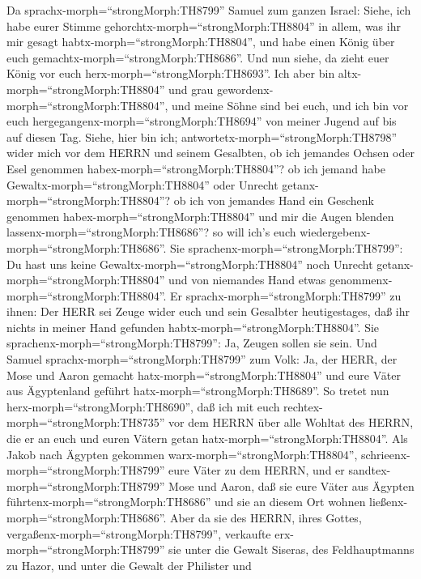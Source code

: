  Da sprachx-morph=``strongMorph:TH8799'' Samuel zum ganzen
Israel: Siehe, ich habe eurer Stimme
gehorchtx-morph=``strongMorph:TH8804'' in allem, was ihr mir gesagt
habtx-morph=``strongMorph:TH8804'', und habe einen König über euch
gemachtx-morph=``strongMorph:TH8686''.  Und nun siehe, da
zieht euer König vor euch herx-morph=``strongMorph:TH8693''. Ich aber
bin altx-morph=``strongMorph:TH8804'' und grau
gewordenx-morph=``strongMorph:TH8804'', und meine Söhne sind bei euch,
und ich bin vor euch hergegangenx-morph=``strongMorph:TH8694'' von
meiner Jugend auf bis auf diesen Tag.  Siehe, hier bin ich;
antwortetx-morph=``strongMorph:TH8798'' wider mich vor dem HERRN und
seinem Gesalbten, ob ich jemandes Ochsen oder Esel genommen
habex-morph=``strongMorph:TH8804''? ob ich jemand habe
Gewaltx-morph=``strongMorph:TH8804'' oder Unrecht
getanx-morph=``strongMorph:TH8804''? ob ich von jemandes Hand ein
Geschenk genommen habex-morph=``strongMorph:TH8804'' und mir die Augen
blenden lassenx-morph=``strongMorph:TH8686''? so will ich's euch
wiedergebenx-morph=``strongMorph:TH8686''.  Sie
sprachenx-morph=``strongMorph:TH8799'': Du hast uns keine
Gewaltx-morph=``strongMorph:TH8804'' noch Unrecht
getanx-morph=``strongMorph:TH8804'' und von niemandes Hand etwas
genommenx-morph=``strongMorph:TH8804''.  Er
sprachx-morph=``strongMorph:TH8799'' zu ihnen: Der HERR sei Zeuge wider
euch und sein Gesalbter heutigestages, daß ihr nichts in meiner Hand
gefunden habtx-morph=``strongMorph:TH8804''. Sie
sprachenx-morph=``strongMorph:TH8799'': Ja, Zeugen sollen sie sein.
 Und Samuel sprachx-morph=``strongMorph:TH8799'' zum Volk:
Ja, der HERR, der Mose und Aaron gemacht
hatx-morph=``strongMorph:TH8804'' und eure Väter aus Ägyptenland geführt
hatx-morph=``strongMorph:TH8689''.  So tretet nun
herx-morph=``strongMorph:TH8690'', daß ich mit euch
rechtex-morph=``strongMorph:TH8735'' vor dem HERRN über alle Wohltat des
HERRN, die er an euch und euren Vätern getan
hatx-morph=``strongMorph:TH8804''.  Als Jakob nach Ägypten
gekommen warx-morph=``strongMorph:TH8804'',
schrieenx-morph=``strongMorph:TH8799'' eure Väter zu dem HERRN, und er
sandtex-morph=``strongMorph:TH8799'' Mose und Aaron, daß sie eure Väter
aus Ägypten führtenx-morph=``strongMorph:TH8686'' und sie an diesem Ort
wohnen ließenx-morph=``strongMorph:TH8686''.  Aber da sie
des HERRN, ihres Gottes, vergaßenx-morph=``strongMorph:TH8799'',
verkaufte erx-morph=``strongMorph:TH8799'' sie unter die Gewalt Siseras,
des Feldhauptmanns zu Hazor, und unter die Gewalt der Philister und
